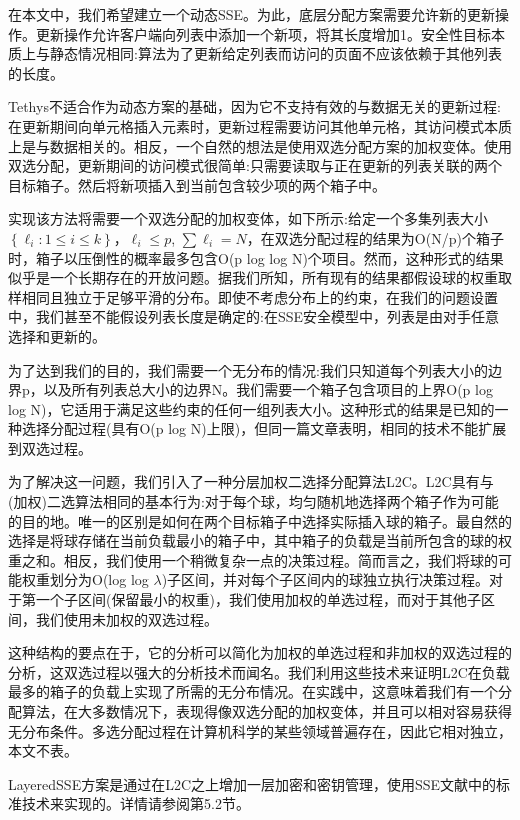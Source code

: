 \documentclass[UTF8]{article}
\begin{document}
在本文中，我们希望建立一个动态SSE。为此，底层分配方案需要允许新的更新操作。更新操作允许客户端向列表中添加一个新项，将其长度增加1。安全性目标本质上与静态情况相同:算法为了更新给定列表而访问的页面不应该依赖于其他列表的长度。

Tethys不适合作为动态方案的基础，因为它不支持有效的与数据无关的更新过程:在更新期间向单元格插入元素时，更新过程需要访问其他单元格，其访问模式本质上是与数据相关的。相反，一个自然的想法是使用双选分配方案的加权变体。使用双选分配，更新期间的访问模式很简单:只需要读取与正在更新的列表关联的两个目标箱子。然后将新项插入到当前包含较少项的两个箱子中。

实现该方法将需要一个双选分配的加权变体，如下所示:给定一个多集列表大小$\left\{\ell_{i}: 1 \leq i \leq k\right\}$，$\ell_{i} \leq p$, $\sum \ell_{i}=N$，在双选分配过程的结果为O(N/p)个箱子时，箱子以压倒性的概率最多包含O(p log log N)个项目。然而，这种形式的结果似乎是一个长期存在的开放问题。据我们所知，所有现有的结果都假设球的权重取样相同且独立于足够平滑的分布。即使不考虑分布上的约束，在我们的问题设置中，我们甚至不能假设列表长度是确定的:在SSE安全模型中，列表是由对手任意选择和更新的。

为了达到我们的目的，我们需要一个无分布的情况:我们只知道每个列表大小的边界p，以及所有列表总大小的边界N。我们需要一个箱子包含项目的上界O(p log log N)，它适用于满足这些约束的任何一组列表大小。这种形式的结果是已知的一种选择分配过程\cite{PetraBerenbrink2005OnWB}(具有O(p log N)上限)，但同一篇文章表明，相同的技术不能扩展到双选过程。

为了解决这一问题，我们引入了一种分层加权二选择分配算法L2C。L2C具有与(加权)二选算法相同的基本行为:对于每个球，均匀随机地选择两个箱子作为可能的目的地。唯一的区别是如何在两个目标箱子中选择实际插入球的箱子。最自然的选择是将球存储在当前负载最小的箱子中，其中箱子的负载是当前所包含的球的权重之和。相反，我们使用一个稍微复杂一点的决策过程。简而言之，我们将球的可能权重划分为O(log log $\lambda$)子区间，并对每个子区间内的球独立执行决策过程。对于第一个子区间(保留最小的权重)，我们使用加权的单选过程，而对于其他子区间，我们使用未加权的双选过程。

这种结构的要点在于，它的分析可以简化为加权的单选过程和非加权的双选过程的分析，这双选过程以强大的分析技术而闻名。我们利用这些技术来证明L2C在负载最多的箱子的负载上实现了所需的无分布情况。在实践中，这意味着我们有一个分配算法，在大多数情况下，表现得像双选分配的加权变体，并且可以相对容易获得无分布条件。多选分配过程在计算机科学的某些领域普遍存在，因此它相对独立，本文不表。

LayeredSSE方案是通过在L2C之上增加一层加密和密钥管理，使用SSE文献中的标准技术来实现的。详情请参阅第5.2节。
\end{document}
